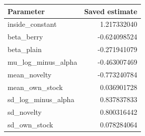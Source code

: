 \begin{longtable}{lr}\toprule Parameter & Saved estimate\\\midrule
inside\_constant & 1.217332040 \\
beta\_berry & -0.624098524 \\
beta\_plain & -0.271941079 \\
mu\_log\_minus\_alpha & -0.463007469 \\
mean\_novelty & -0.773240784 \\
mean\_own\_stock & 0.036901728 \\
sd\_log\_minus\_alpha & 0.837837833 \\
sd\_novelty & 0.800316442 \\
sd\_own\_stock & 0.078284064 \\
\bottomrule\end{longtable}
